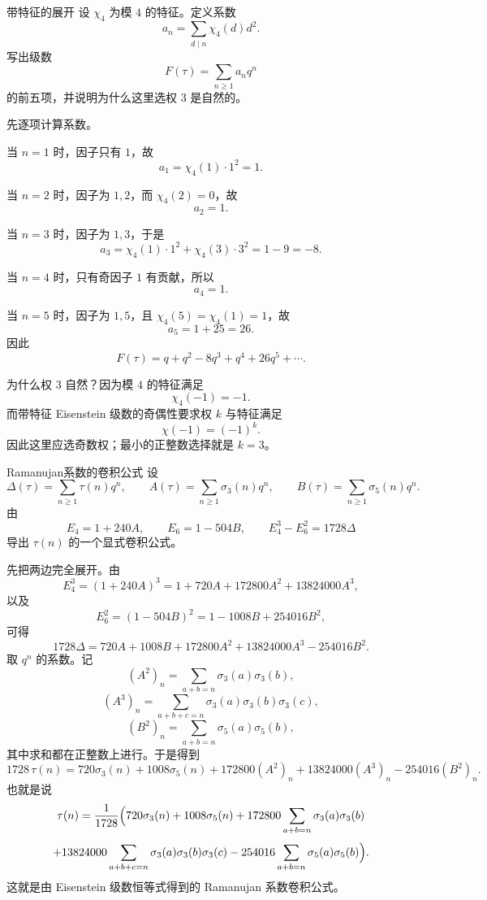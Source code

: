 \begin{problem}{带特征的展开}
\hard
设 $\chi_4$ 为模 $4$ 的特征。定义系数
\[
a_n=\sum_{d\mid n}\chi_4(d)d^2.
\]
写出级数
\[
F(\tau)=\sum_{n\ge1} a_n q^n
\]
的前五项，并说明为什么这里选权 $3$ 是自然的。
\end{problem}
\begin{solution}
先逐项计算系数。

当 $n=1$ 时，因子只有 $1$，故
\[
a_1=\chi_4(1)\cdot 1^2=1.
\]

当 $n=2$ 时，因子为 $1,2$，而 $\chi_4(2)=0$，故
\[
a_2=1.
\]

当 $n=3$ 时，因子为 $1,3$，于是
\[
a_3=\chi_4(1)\cdot 1^2+\chi_4(3)\cdot 3^2=1-9=-8.
\]

当 $n=4$ 时，只有奇因子 $1$ 有贡献，所以
\[
a_4=1.
\]

当 $n=5$ 时，因子为 $1,5$，且 $\chi_4(5)=\chi_4(1)=1$，故
\[
a_5=1+25=26.
\]
因此
\[
F(\tau)=q+q^2-8q^3+q^4+26q^5+\cdots.
\]

为什么权 $3$ 自然？因为模 $4$ 的特征满足
\[
\chi_4(-1)=-1.
\]
而带特征 Eisenstein 级数的奇偶性要求权 $k$ 与特征满足
\[
\chi(-1)=(-1)^k.
\]
因此这里应选奇数权；最小的正整数选择就是 $k=3$。
\end{solution}

\begin{problem}{Ramanujan系数的卷积公式}
\hard
设
\[
\Delta(\tau)=\sum_{n\ge1}\tau(n)q^n,
\qquad
A(\tau)=\sum_{n\ge1}\sigma_3(n)q^n,
\qquad
B(\tau)=\sum_{n\ge1}\sigma_5(n)q^n.
\]
由
\[
E_4=1+240A,
\qquad
E_6=1-504B,
\qquad
E_4^3-E_6^2=1728\Delta
\]
导出 $\tau(n)$ 的一个显式卷积公式。
\end{problem}
\begin{solution}
先把两边完全展开。由
\[
E_4^3=(1+240A)^3=1+720A+172800A^2+13824000A^3,
\]
以及
\[
E_6^2=(1-504B)^2=1-1008B+254016B^2,
\]
可得
\[
1728\Delta
=720A+1008B+172800A^2+13824000A^3-254016B^2.
\]
取 $q^n$ 的系数。记
\[
(A^2)_n=\sum_{a+b=n}\sigma_3(a)\sigma_3(b),
\]
\[
(A^3)_n=\sum_{a+b+c=n}\sigma_3(a)\sigma_3(b)\sigma_3(c),
\]
\[
(B^2)_n=\sum_{a+b=n}\sigma_5(a)\sigma_5(b),
\]
其中求和都在正整数上进行。于是得到
\[
1728\,\tau(n)
=720\sigma_3(n)+1008\sigma_5(n)+172800(A^2)_n+13824000(A^3)_n-254016(B^2)_n.
\]
也就是说
\[
\tau(n)=\frac{1}{1728}\Bigl(
720\sigma_3(n)+1008\sigma_5(n)
+172800\sum_{a+b=n}\sigma_3(a)\sigma_3(b)
\Bigr.
\]
\[
\Bigl.
+13824000\sum_{a+b+c=n}\sigma_3(a)\sigma_3(b)\sigma_3(c)
-254016\sum_{a+b=n}\sigma_5(a)\sigma_5(b)
\Bigr).
\]
这就是由 Eisenstein 级数恒等式得到的 Ramanujan 系数卷积公式。
\end{solution}
